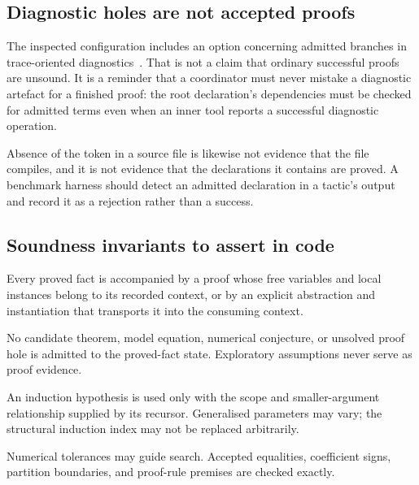 \subsection{Diagnostic holes are not accepted proofs}

The inspected \grind{} configuration includes an option concerning admitted
branches in trace-oriented diagnostics~\cite{grind-config}. That is not a claim
that ordinary successful \grind{} proofs are unsound. It is a reminder that a
coordinator must never mistake a diagnostic artefact for a finished proof: the
root declaration's dependencies must be checked for admitted terms even when an
inner tool reports a successful diagnostic operation.

Absence of the token  in a source file is likewise not evidence
that the file compiles, and it is not evidence that the declarations it
contains are proved. A benchmark harness should detect an admitted declaration
in a tactic's output and record it as a rejection rather than a success.

\subsection{Soundness invariants to assert in code}

\begin{invariant}
Every proved fact is accompanied by a proof whose free variables and local
instances belong to its recorded context, or by an explicit abstraction and
instantiation that transports it into the consuming context.
\end{invariant}

\begin{invariant}
No candidate theorem, model equation, numerical conjecture, or unsolved proof
hole is admitted to the proved-fact state. Exploratory assumptions never serve
as proof evidence.
\end{invariant}

\begin{invariant}
An induction hypothesis is used only with the scope and smaller-argument
relationship supplied by its recursor. Generalised parameters may vary; the
structural induction index may not be replaced arbitrarily.
\end{invariant}

\begin{invariant}
Numerical tolerances may guide search. Accepted equalities, coefficient signs,
partition boundaries, and proof-rule premises are checked exactly.
\end{invariant}

